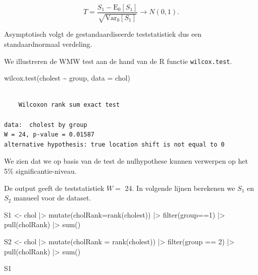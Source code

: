 \documentclass[
  dutch,
  letterpaper,
  12pt]{book}
\newenvironment{Shaded}{\begin{snugshade}}{\end{snugshade}}
\newcommand{\AttributeTok}[1]{\textcolor[rgb]{0.40,0.45,0.13}{#1}}
\newcommand{\DecValTok}[1]{\textcolor[rgb]{0.68,0.00,0.00}{#1}}
\newcommand{\FunctionTok}[1]{\textcolor[rgb]{0.28,0.35,0.67}{#1}}
\newcommand{\NormalTok}[1]{\textcolor[rgb]{0.00,0.23,0.31}{#1}}
\newcommand{\OtherTok}[1]{\textcolor[rgb]{0.00,0.23,0.31}{#1}}
\newcommand{\SpecialCharTok}[1]{\textcolor[rgb]{0.37,0.37,0.37}{#1}}
\theoremstyle{definition}
\theoremstyle{definition}
\theoremstyle{definition}
\theoremstyle{remark}
\begin{document}
\[T = \frac{S_1-\text{E}_{0}\left[S_1\right]}{\sqrt{\text{Var}_{0}\left[S_1\right]}} \rightarrow N(0,1).\]

Asymptotisch volgt de gestandaardiseerde teststatistiek dus een
standaardnormaal verdeling.

We illustreren de WMW test aan de hand van de R functie
\texttt{wilcox.test}.

\begin{Shaded}
\begin{Highlighting}[]
\FunctionTok{wilcox.test}\NormalTok{(cholest }\SpecialCharTok{\textasciitilde{}}\NormalTok{ group, }\AttributeTok{data =}\NormalTok{ chol)}
\end{Highlighting}
\end{Shaded}

\begin{verbatim}

    Wilcoxon rank sum exact test

data:  cholest by group
W = 24, p-value = 0.01587
alternative hypothesis: true location shift is not equal to 0
\end{verbatim}

We zien dat we op basis van de test de nulhypothese kunnen verwerpen op
het 5\% significantie-niveau.

De output geeft de teststatistiek \(W=\) 24. In volgende lijnen
berekenen we \(S_1\) en \(S_2\) manueel voor de dataset.

\begin{Shaded}
\begin{Highlighting}[]
\NormalTok{S1 }\OtherTok{\textless{}{-}}\NormalTok{ chol }\SpecialCharTok{|\textgreater{}}
  \FunctionTok{mutate}\NormalTok{(}\AttributeTok{cholRank=}\FunctionTok{rank}\NormalTok{(cholest)) }\SpecialCharTok{|\textgreater{}}
  \FunctionTok{filter}\NormalTok{(group}\SpecialCharTok{==}\DecValTok{1}\NormalTok{) }\SpecialCharTok{|\textgreater{}}
  \FunctionTok{pull}\NormalTok{(cholRank) }\SpecialCharTok{|\textgreater{}}
  \FunctionTok{sum}\NormalTok{()}

\NormalTok{S2 }\OtherTok{\textless{}{-}}\NormalTok{ chol }\SpecialCharTok{|\textgreater{}}
  \FunctionTok{mutate}\NormalTok{(}\AttributeTok{cholRank =} \FunctionTok{rank}\NormalTok{(cholest)) }\SpecialCharTok{|\textgreater{}}
  \FunctionTok{filter}\NormalTok{(group }\SpecialCharTok{==} \DecValTok{2}\NormalTok{) }\SpecialCharTok{|\textgreater{}}
  \FunctionTok{pull}\NormalTok{(cholRank) }\SpecialCharTok{|\textgreater{}}
  \FunctionTok{sum}\NormalTok{()}

\NormalTok{S1}
\end{Highlighting}
\end{Shaded}
\end{document}
